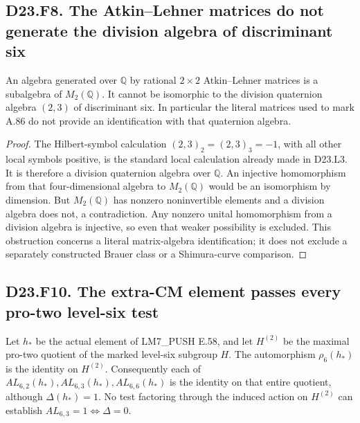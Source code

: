 \subsection*{D23.F8. The Atkin--Lehner matrices do not generate the division algebra of discriminant six}
An algebra generated over $\mathbb Q$ by rational
$2\times2$ Atkin--Lehner matrices is a subalgebra of
$M_2(\mathbb Q)$.  It cannot be isomorphic to the division
quaternion algebra $(2,3)$ of discriminant six.  In particular
the literal matrices used to mark A.86 do not provide an
identification with that quaternion algebra.

\begin{proof}
The Hilbert-symbol calculation $(2,3)_2=(2,3)_3=-1$,
with all other local symbols positive, is the standard
local calculation already made in D23.L3.  It is therefore
a division quaternion algebra over $\mathbb Q$.
An injective homomorphism from that four-dimensional algebra
to $M_2(\mathbb Q)$ would be an isomorphism by dimension.
But $M_2(\mathbb Q)$ has nonzero noninvertible elements and
a division algebra does not, a contradiction.  Any nonzero
unital homomorphism from a division algebra is injective,
so even that weaker possibility is excluded.
This obstruction concerns a literal matrix-algebra
identification; it does not exclude a separately constructed
Brauer class or a Shimura-curve comparison.
\end{proof}

\subsection*{D23.F10. The extra-CM element passes every pro-two level-six test}
Let $h_*$ be the actual element of LM7\_PUSH E.58, and let
$H^{(2)}$ be the maximal pro-two quotient of the marked
level-six subgroup $H$.  The automorphism $\rho_6(h_*)$
is the identity on $H^{(2)}$. Consequently each of
$AL_{6,2}(h_*),AL_{6,3}(h_*),AL_{6,6}(h_*)$ is the identity
on that entire quotient, although $\Delta(h_*)=1$.
No test factoring through the induced action on
$H^{(2)}$ can establish $AL_{6,3}=1\Longleftrightarrow\Delta=0$.

